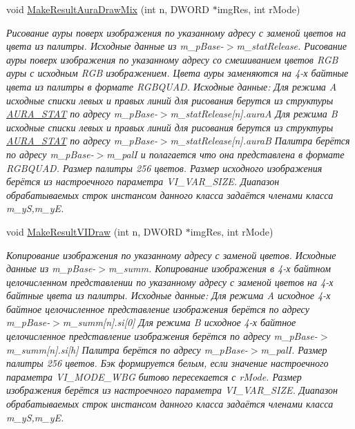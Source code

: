 \begin{DoxyCompactItemize}
void \hyperlink{class_c_v_i_engine_thread_a61e44ad37880d66e07855e751b67d9d3}{Make\+Result\+Aura\+Draw\+Mix} (int n, D\+W\+O\+R\+D $\ast$img\+Res, int r\+Mode)
\begin{DoxyCompactList}\small\item\em Рисование ауры поверх изображения по указанному адресу с заменой цветов на цвета из палитры. Исходные данные из m\+\_\+p\+Base-\/$>$m\+\_\+stat\+Release. Рисование ауры поверх изображения по указанному адресу со смешиванием цветов R\+G\+B ауры с исходным R\+G\+B изображением. Цвета ауры заменяются на 4-\/х байтные цвета из палитры в формате R\+G\+B\+Q\+U\+A\+D. Исходные данные\+: Для режима A исходные списки левых и правых линий для рисования берутся из структуры \hyperlink{class_a_u_r_a___s_t_a_t}{A\+U\+R\+A\+\_\+\+S\+T\+A\+T} по адресу m\+\_\+p\+Base-\/$>$m\+\_\+stat\+Release\mbox{[}n\mbox{]}.aura\+A Для режима B исходные списки левых и правых линий для рисования берутся из структуры \hyperlink{class_a_u_r_a___s_t_a_t}{A\+U\+R\+A\+\_\+\+S\+T\+A\+T} по адресу m\+\_\+p\+Base-\/$>$m\+\_\+stat\+Release\mbox{[}n\mbox{]}.aura\+B Палитра берётся по адресу m\+\_\+p\+Base-\/$>$m\+\_\+pal\+I и полагается что она представлена в формате R\+G\+B\+Q\+U\+A\+D. Размер палитры 256 цветов. Размер исходного изображения берётся из настроечного параметра V\+I\+\_\+\+V\+A\+R\+\_\+\+S\+I\+Z\+E. Диапазон обрабатываемых строк инстансом данного класса задаётся членами класса m\+\_\+y\+S,m\+\_\+y\+E. \end{DoxyCompactList}\item 
void \hyperlink{class_c_v_i_engine_thread_abf2a40038d465ccb943072431774c6ae}{Make\+Result\+V\+I\+Draw} (int n, D\+W\+O\+R\+D $\ast$img\+Res, int r\+Mode)
\begin{DoxyCompactList}\small\item\em Копирование изображения по указанному адресу с заменой цветов. Исходные данные из m\+\_\+p\+Base-\/$>$m\+\_\+summ. Копирование изображения в 4-\/х байтном целочисленном представлении по указанному адресу с заменой цветов на 4-\/х байтные цвета из палитры. Исходные данные\+: Для режима A исходное 4-\/х байтное целочисленное представление изображения берётся по адресу m\+\_\+p\+Base-\/$>$m\+\_\+summ\mbox{[}n\mbox{]}.si\mbox{[}0\mbox{]} Для режима B исходное 4-\/х байтное целочисленное представление изображения берётся по адресу m\+\_\+p\+Base-\/$>$m\+\_\+summ\mbox{[}n\mbox{]}.si\mbox{[}h\mbox{]} Палитра берётся по адресу m\+\_\+p\+Base-\/$>$m\+\_\+pal\+I. Размер палитры 256 цветов. Бэк формируется белым, если значение настроечного параметра V\+I\+\_\+\+M\+O\+D\+E\+\_\+\+W\+B\+G битово пересекается с r\+Mode. Размер изображения берётся из настроечного параметра V\+I\+\_\+\+V\+A\+R\+\_\+\+S\+I\+Z\+E. Диапазон обрабатываемых строк инстансом данного класса задаётся членами класса m\+\_\+y\+S,m\+\_\+y\+E. \end{DoxyCompactList}\item 

\end{DoxyCompactItemize}
